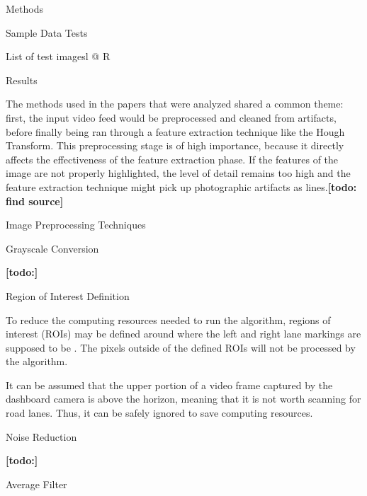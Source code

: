 \documentclass{matthijs}
\begin{document}
\begin{hoofdstuk}{Methods}
\begin{paragraaf}{Sample Data Tests}
\begin{tabel}{List of test images}{l @{\extracolsep{\fill}} R}
			\end{tabel}

		\end{paragraaf}

	\end{hoofdstuk}

	\begin{hoofdstuk}{Results}

		The methods used in the papers that were analyzed shared a common theme: first, the input video feed would be preprocessed and cleaned from artifacts, before finally being ran through a feature extraction technique like the Hough Transform.
		This preprocessing stage is of high importance, because it directly affects the effectiveness of the feature extraction phase.
		If the features of the image are not properly highlighted, the level of detail remains too high and the feature extraction technique might pick up photographic artifacts as lines.\textbf{[todo: find source]}

		\begin{paragraaf}{Image Preprocessing Techniques}

			\begin{subparagraaf}{Grayscale Conversion}

				\textbf{[todo:]}
			
			\end{subparagraaf}

			\begin{subparagraaf}{Region of Interest Definition}

				To reduce the computing resources needed to run the algorithm, regions of interest (ROIs) may be defined around where the left and right lane markings are supposed to be \cite{el2020novel}.
				The pixels outside of the defined ROIs will not be processed by the algorithm.
				
				\bigskip

				It can be assumed that the upper portion of a video frame captured by the dashboard camera is above the horizon, meaning that it is not worth scanning for road lanes.
				Thus, it can be safely ignored to save computing resources.

			\end{subparagraaf}

			\begin{subparagraaf}{Noise Reduction}

				\textbf{[todo:]}

				\begin{subsubparagraaf}{Average Filter}


\end{subsubparagraaf}
\end{subparagraaf}
\end{paragraaf}
\end{hoofdstuk}
\end{document}
